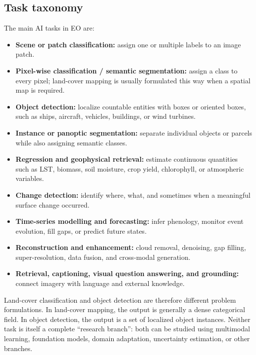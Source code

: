 \documentclass[
  a4paper,
  11pt]{article}
\providecommand{\tightlist}{%
  \setlength{\itemsep}{0pt}\setlength{\parskip}{0pt}}
\begin{document}
\hypertarget{task-taxonomy}{%
\subsection{Task taxonomy}\label{task-taxonomy}}

The main AI tasks in EO are:

\begin{itemize}
\tightlist
\item
  \textbf{Scene or patch classification:} assign one or multiple labels
  to an image patch.
\item
  \textbf{Pixel-wise classification / semantic segmentation:} assign a
  class to every pixel; land-cover mapping is usually formulated this
  way when a spatial map is required.
\item
  \textbf{Object detection:} localize countable entities with boxes or
  oriented boxes, such as ships, aircraft, vehicles, buildings, or wind
  turbines.
\item
  \textbf{Instance or panoptic segmentation:} separate individual
  objects or parcels while also assigning semantic classes.
\item
  \textbf{Regression and geophysical retrieval:} estimate continuous
  quantities such as LST, biomass, soil moisture, crop yield,
  chlorophyll, or atmospheric variables.
\item
  \textbf{Change detection:} identify where, what, and sometimes when a
  meaningful surface change occurred.
\item
  \textbf{Time-series modelling and forecasting:} infer phenology,
  monitor event evolution, fill gaps, or predict future states.
\item
  \textbf{Reconstruction and enhancement:} cloud removal, denoising, gap
  filling, super-resolution, data fusion, and cross-modal generation.
\item
  \textbf{Retrieval, captioning, visual question answering, and
  grounding:} connect imagery with language and external knowledge.
\end{itemize}

Land-cover classification and object detection are therefore different
problem formulations. In land-cover mapping, the output is generally a
dense categorical field. In object detection, the output is a set of
localized object instances. Neither task is itself a complete ``research
branch'': both can be studied using multimodal learning, foundation
models, domain adaptation, uncertainty estimation, or other branches.
\end{document}
